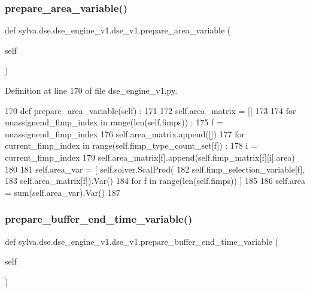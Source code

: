 \subsubsection{\texorpdfstring{prepare\+\_\+area\+\_\+variable()}{prepare\_area\_variable()}}
{\footnotesize\ttfamily def sylva.\+dse.\+dse\+\_\+engine\+\_\+v1.\+dse\+\_\+v1.\+prepare\+\_\+area\+\_\+variable (\begin{DoxyParamCaption}\item[{}]{self }\end{DoxyParamCaption})}



Definition at line 170 of file dse\+\_\+engine\+\_\+v1.\+py.


\begin{DoxyCode}
170   \textcolor{keyword}{def }prepare\_area\_variable(self) :
171 
172     self.area\_matrix = []
173 
174     \textcolor{keywordflow}{for} unassignend\_fimp\_index \textcolor{keywordflow}{in} range(len(self.fimps)) :
175       f = unassignend\_fimp\_index
176       self.area\_matrix.append([])
177       \textcolor{keywordflow}{for} current\_fimp\_index \textcolor{keywordflow}{in} range(self.fimp\_type\_count\_set[f]) :
178         i = current\_fimp\_index
179         self.area\_matrix[f].append(self.fimp\_matrix[f][i].area)
180 
181     self.area\_var = [ self.solver.ScalProd(
182                         self.fimp\_selection\_variable[f],
183                         self.area\_matrix[f]).Var()
184                       \textcolor{keywordflow}{for} f \textcolor{keywordflow}{in} range(len(self.fimps)) ]
185 
186     self.area = sum(self.area\_var).Var()
187 
\end{DoxyCode}
\mbox{\label{classsylva_1_1dse_1_1dse__engine__v1_1_1dse__v1_ae5ffc9ead2cb2e795efa2a4e9a824a42}} 
\subsubsection{\texorpdfstring{prepare\+\_\+buffer\+\_\+end\+\_\+time\+\_\+variable()}{prepare\_buffer\_end\_time\_variable()}}
{\footnotesize\ttfamily def sylva.\+dse.\+dse\+\_\+engine\+\_\+v1.\+dse\+\_\+v1.\+prepare\+\_\+buffer\+\_\+end\+\_\+time\+\_\+variable (\begin{DoxyParamCaption}\item[{}]{self }\end{DoxyParamCaption})}




